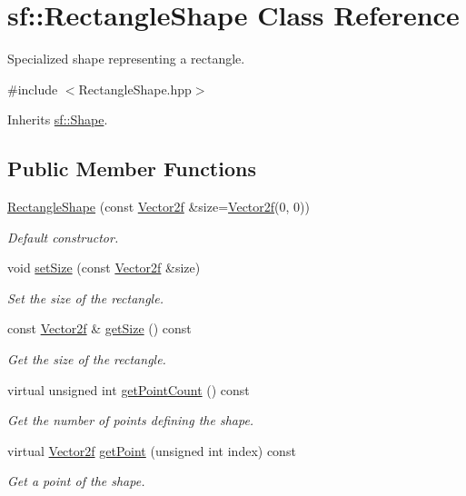 \hypertarget{classsf_1_1_rectangle_shape}{\section{sf\+:\+:Rectangle\+Shape Class Reference}
\label{classsf_1_1_rectangle_shape}
}


Specialized shape representing a rectangle.  




{\ttfamily \#include $<$Rectangle\+Shape.\+hpp$>$}



Inherits \hyperlink{classsf_1_1_shape}{sf\+::\+Shape}.

\subsection*{Public Member Functions}
\begin{DoxyCompactItemize}
\item 
\hyperlink{classsf_1_1_rectangle_shape_a83a2be157ebee85c95ed491c3e78dd7c}{Rectangle\+Shape} (const \hyperlink{classsf_1_1_vector2}{Vector2f} \&size=\hyperlink{classsf_1_1_vector2}{Vector2f}(0, 0))
\begin{DoxyCompactList}\small\item\em Default constructor. \end{DoxyCompactList}\item 
void \hyperlink{classsf_1_1_rectangle_shape_a5c65d374d4a259dfdc24efdd24a5dbec}{set\+Size} (const \hyperlink{classsf_1_1_vector2}{Vector2f} \&size)
\begin{DoxyCompactList}\small\item\em Set the size of the rectangle. \end{DoxyCompactList}\item 
const \hyperlink{classsf_1_1_vector2}{Vector2f} \& \hyperlink{classsf_1_1_rectangle_shape_acaacbaee87c38a526a9d895742faab54}{get\+Size} () const 
\begin{DoxyCompactList}\small\item\em Get the size of the rectangle. \end{DoxyCompactList}\item 
virtual unsigned int \hyperlink{classsf_1_1_rectangle_shape_a439f5a92583baf972878c836b73bf955}{get\+Point\+Count} () const 
\begin{DoxyCompactList}\small\item\em Get the number of points defining the shape. \end{DoxyCompactList}\item 
virtual \hyperlink{classsf_1_1_vector2}{Vector2f} \hyperlink{classsf_1_1_rectangle_shape_a3994f7f937d6332fe64b6990d5bc43a1}{get\+Point} (unsigned int index) const 
\begin{DoxyCompactList}\small\item\em Get a point of the shape. \end{DoxyCompactList}\end{DoxyCompactItemize}
